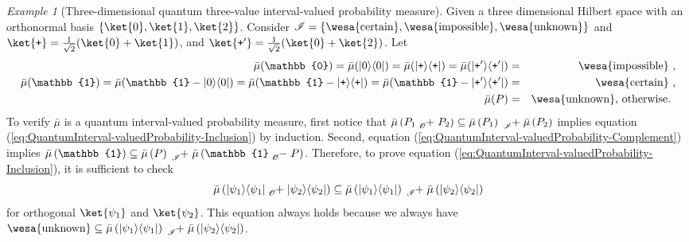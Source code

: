 \documentclass{article}
\theoremstyle{remark}
\newtheorem{example}{Example}
\newcommand{\proj}[1]{|#1 \rangle\langle #1 |}
\newcommand{\ps}{\texttt{+}}
\newcommand{\imposs}{{\mbox{\wesa{impossible}}}}
\newcommand{\necess}{{\mbox{\wesa{certain}}}}
\newcommand{\unknown}{{\mbox{\wesa{unknown}}}}
\begin{document}
\begin{example}[Three-dimensional quantum three-value interval-valued
probability measure]\label{ex:three-dimensional-three-value} Given
a three dimensional Hilbert space with an orthonormal basis $\left\{ \ket{0},\ket{1},\ket{2}\right\} $.
Consider\emph{ $\mathscr{I}=\left\{ \necess,\imposs,\unknown\right\} $}
and $\ket{\ps}=\frac{1}{\sqrt{2}}(\ket{0}+\ket{1})$, and $\ket{\ps'}=\frac{1}{\sqrt{2}}(\ket{0}+\ket{2})$.
Let 
\begin{eqnarray*}
\bar{\mu}(\mathbb{0})=\bar{\mu}(\proj{0})=\bar{\mu}(\proj{\ps})=\bar{\mu}(\proj{\ps'}) & = & \imposs\textrm{ ,}\\
\bar{\mu}(\mathbb{1})=\bar{\mu}(\mathbb{1}-\proj{0})=\bar{\mu}(\mathbb{1}-\proj{\ps})=\bar{\mu}(\mathbb{1}-\proj{\ps'}) & = & \necess\textrm{ ,}\\
\bar{\mu}(P) & = & \unknown\textrm{, otherwise. }
\end{eqnarray*}
To verify $\bar{\mu}$ is a quantum interval-valued probability measure,
first notice that $\bar{\mu}\left(P_{1}\tensor*[_{\mathscr{O}}]{+}{}P_{2}\right)\subseteq\bar{\mu}\left(P_{1}\right)\tensor*[_{\mathscr{I}}]{+}{}\bar{\mu}\left(P_{2}\right)$
implies equation (\ref{eq:QuantumInterval-valuedProbability-Inclusion})
by induction. Second, equation (\ref{eq:QuantumInterval-valuedProbability-Complement})
implies $\bar{\mu}\left(\mathbb{1}\right)\subseteq\bar{\mu}\left(P\right)\tensor*[_{\mathscr{I}}]{+}{}\bar{\mu}\left(\mathbb{1}\tensor*[_{\mathscr{O}}]{-}{}P\right)$.
Therefore, to prove equation (\ref{eq:QuantumInterval-valuedProbability-Inclusion}),
it is sufficient to check 
\[
\bar{\mu}\left(\proj{\psi_{1}}\tensor*[_{\mathscr{O}}]{+}{}\proj{\psi_{2}}\right)\subseteq\bar{\mu}\left(\proj{\psi_{1}}\right)\tensor*[_{\mathscr{I}}]{+}{}\bar{\mu}\left(\proj{\psi_{2}}\right)
\]
for orthogonal $\ket{\psi_{1}}$ and $\ket{\psi_{2}}$. This equation
always holds because we always have $\unknown\subseteq\bar{\mu}\left(\proj{\psi_{1}}\right)\tensor*[_{\mathscr{I}}]{+}{}\bar{\mu}\left(\proj{\psi_{2}}\right)$.


\end{example}
\end{document}
